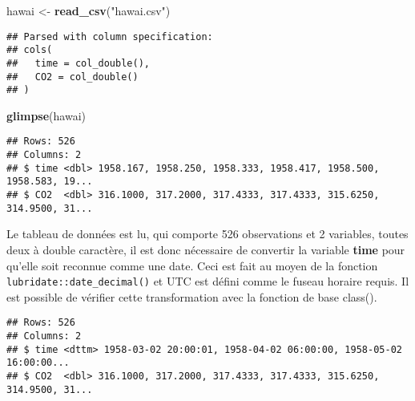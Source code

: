 \documentclass[
]{article}
\newenvironment{Shaded}{\begin{snugshade}}{\end{snugshade}}
\newcommand{\DataTypeTok}[1]{\textcolor[rgb]{0.13,0.29,0.53}{#1}}
\newcommand{\KeywordTok}[1]{\textcolor[rgb]{0.13,0.29,0.53}{\textbf{#1}}}
\newcommand{\NormalTok}[1]{#1}
\newcommand{\OperatorTok}[1]{\textcolor[rgb]{0.81,0.36,0.00}{\textbf{#1}}}
\newcommand{\StringTok}[1]{\textcolor[rgb]{0.31,0.60,0.02}{#1}}
\begin{document}
\begin{Shaded}
\begin{Highlighting}[]
\NormalTok{hawai <-}\StringTok{ }\KeywordTok{read_csv}\NormalTok{(}\StringTok{"hawai.csv"}\NormalTok{)}
\end{Highlighting}
\end{Shaded}

\begin{verbatim}
## Parsed with column specification:
## cols(
##   time = col_double(),
##   CO2 = col_double()
## )
\end{verbatim}

\begin{Shaded}
\begin{Highlighting}[]
\KeywordTok{glimpse}\NormalTok{(hawai)}
\end{Highlighting}
\end{Shaded}

\begin{verbatim}
## Rows: 526
## Columns: 2
## $ time <dbl> 1958.167, 1958.250, 1958.333, 1958.417, 1958.500, 1958.583, 19...
## $ CO2  <dbl> 316.1000, 317.2000, 317.4333, 317.4333, 315.6250, 314.9500, 31...
\end{verbatim}

Le tableau de données est lu, qui comporte 526 observations et 2
variables, toutes deux à double caractère, il est donc nécessaire de
convertir la variable \textbf{time} pour qu'elle soit reconnue comme une
date. Ceci est fait au moyen de la fonction
\texttt{lubridate::date\_decimal()} et UTC est défini comme le fuseau
horaire requis. Il est possible de vérifier cette transformation avec la
fonction de base class().

\begin{Shaded}
\end{Shaded}

\begin{verbatim}
## Rows: 526
## Columns: 2
## $ time <dttm> 1958-03-02 20:00:01, 1958-04-02 06:00:00, 1958-05-02 16:00:00...
## $ CO2  <dbl> 316.1000, 317.2000, 317.4333, 317.4333, 315.6250, 314.9500, 31...
\end{verbatim}
\end{document}
